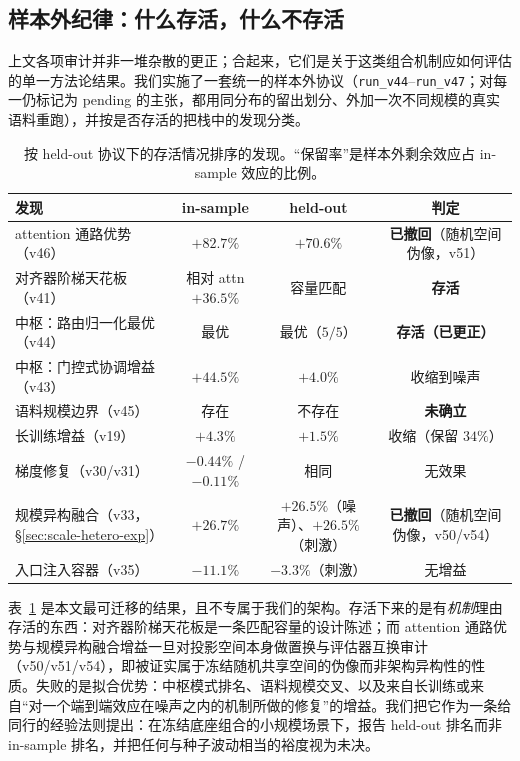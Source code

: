 \documentclass[10pt,twoside]{article}
\theoremstyle{definition}
\theoremstyle{plain}
\theoremstyle{remark}
\begin{document}
\subsection{样本外纪律：什么存活，什么不存活}
\label{sec:oos}

上文各项审计并非一堆杂散的更正；合起来，它们是关于这类组合机制应如何评估的单一方法论结果。我们实施了一套统一的样本外协议（\texttt{run\_v44}--\texttt{run\_v47}；对每一仍标记为 pending 的主张，都用同分布的留出划分、外加一次不同规模的真实语料重跑），并按是否存活的把栈中的发现分类。

\begin{table}[htbp]
\centering
\caption{按 held-out 协议下的存活情况排序的发现。``保留率''是样本外剩余效应占 in-sample 效应的比例。}
\label{tab:oos}
\small
\setlength{\tabcolsep}{4.5pt}
\begin{tabular}{p{}ccc}
\toprule
\textbf{发现} & \textbf{in-sample} & \textbf{held-out} & \textbf{判定} \\
\midrule
attention 通路优势（v46） & $+82.7\%$ & $+70.6\%$ & \textbf{已撤回}（随机空间伪像，v51） \\
对齐器阶梯天花板（v41） & 相对 attn $+36.5\%$ & 容量匹配 & \textbf{存活} \\
中枢：路由归一化最优（v44） & 最优 & 最优（$5/5$） & \textbf{存活（已更正）} \\
中枢：门控式协调增益（v43） & $+44.5\%$ & $+4.0\%$ & 收缩到噪声 \\
语料规模边界（v45） & 存在 & 不存在 & \textbf{未确立} \\
长训练增益（v19） & $+4.3\%$ & $+1.5\%$ & 收缩（保留 $34\%$） \\
梯度修复（v30/v31） & $-0.44\%$ / $-0.11\%$ & 相同 & 无效果 \\
规模异构融合（v33，\S\ref{sec:scale-hetero-exp}） & $+26.7\%$ & $+26.5\%$（噪声）、$+26.5\%$（刺激） & \textbf{已撤回}（随机空间伪像，v50/v54） \\
入口注入容器（v35） & $-11.1\%$ & $-3.3\%$（刺激） & 无增益 \\
\bottomrule
\end{tabular}
\end{table}

表~\ref{tab:oos} 是本文最可迁移的结果，且不专属于我们的架构。存活下来的是有\emph{机制}理由存活的东西：对齐器阶梯天花板是一条匹配容量的设计陈述；而 attention 通路优势与规模异构融合增益一旦对投影空间本身做置换与评估器互换审计（v50/v51/v54），即被证实属于冻结随机共享空间的伪像而非架构异构性的性质。失败的是拟合优势：中枢模式排名、语料规模交叉、以及来自长训练或来自``对一个端到端效应在噪声之内的机制所做的修复''的增益。我们把它作为一条给同行的经验法则提出：在冻结底座组合的小规模场景下，报告 held-out 排名而非 in-sample 排名，并把任何与种子波动相当的裕度视为未决。
\end{document}
